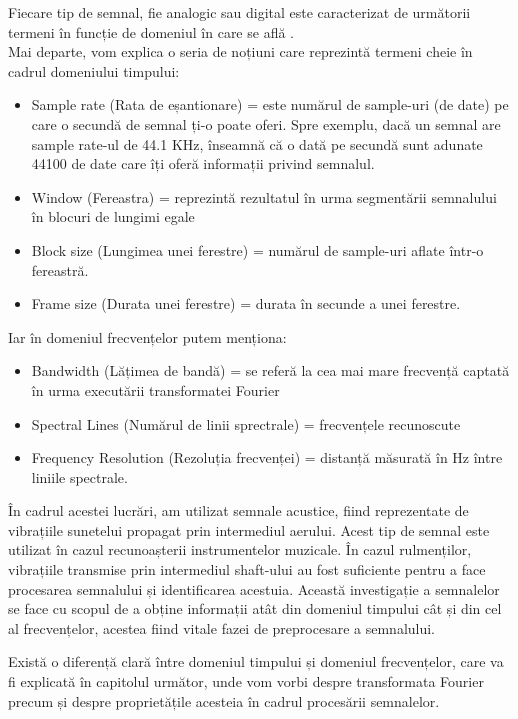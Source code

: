 \documentclass[a4paper,12pt]{report}
\begin{document}
    Fiecare tip de semnal, fie analogic sau digital este caracterizat de următorii termeni în funcție de domeniul în care se află \cite{SISW_DSP}. \\
    Mai departe, vom explica o seria de noțiuni care reprezintă termeni cheie în cadrul domeniului timpului:
    
    \begin{itemize}
    	\item Sample rate (Rata de eșantionare) = este numărul de sample-uri (de date) pe care o secundă de semnal ți-o poate oferi. Spre exemplu, dacă un semnal are sample rate-ul de 44.1 KHz, înseamnă că o dată pe secundă sunt adunate 44100 de date care îți oferă informații privind semnalul.
    	\item Window (Fereastra) = reprezintă rezultatul în urma segmentării semnalului în blocuri de lungimi egale
    	\item Block size (Lungimea unei ferestre) = numărul de sample-uri aflate într-o fereastră.
    	\item Frame size (Durata unei ferestre) = durata în secunde a unei ferestre.
    \end{itemize}
    
    Iar în domeniul frecvențelor putem menționa:
    
    \begin{itemize}
    	\item Bandwidth (Lățimea de bandă) = se referă la cea mai mare frecvență captată în urma executării transformatei Fourier
    	\item Spectral Lines (Numărul de linii sprectrale) = frecvențele recunoscute
    	\item Frequency Resolution (Rezoluția frecvenței) = distanță măsurată în Hz între liniile spectrale.
	\end{itemize}
	
	
	În cadrul acestei lucrări, am utilizat semnale acustice, fiind reprezentate de vibrațiile sunetelui propagat prin intermediul aerului. Acest tip de semnal este utilizat în cazul recunoașterii instrumentelor muzicale. În cazul rulmenților, vibrațiile transmise prin intermediul shaft-ului au fost suficiente pentru a face procesarea semnalului și identificarea acestuia. Această  investigație a semnalelor se face cu scopul de a obține informații atât din domeniul timpului cât și din cel al frecvențelor, acestea fiind vitale fazei de preprocesare a semnalului.
	
	Există o diferență clară între domeniul timpului și domeniul frecvențelor, care va fi explicată în capitolul următor, unde vom vorbi despre transformata Fourier precum și despre proprietățile acesteia în cadrul procesării semnalelor.
	
\end{document}

